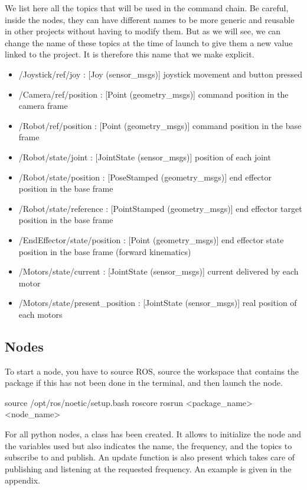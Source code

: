 We list here all the topics that will be used in the command chain. Be careful, inside the nodes, they can have different names to be more generic and reusable in other projects without having to modify them. But as we will see, we can change the name of these topics at the time of launch to give them a new value linked to the project. It is therefore this name that we make explicit. 
\begin{itemize}
    \item /Joystick/ref/joy : [Joy (sensor\_msgs)] joystick movement and button pressed
    \item /Camera/ref/position : [Point (geometry\_msgs)] command position in the camera frame
    \item /Robot/ref/position : [Point (geometry\_msgs)] command position in the base frame
    \item /Robot/state/joint : [JointState (sensor\_msgs)] position of each joint
    \item /Robot/state/position : [PoseStamped (geometry\_msgs)] end effector position in the base frame
    \item /Robot/state/reference : [PointStamped (geometry\_msgs)] end effector target position in the base frame
    \item /EndEffector/state/position : [Point (geometry\_msgs)] end effector state position in the base frame (forward kinematics)
    \item /Motors/state/current : [JointState (sensor\_msgs)] current delivered by each motor
    \item /Motors/state/present\_position : [JointState (sensor\_msgs)] real position of each motors
\end{itemize}

\subsection{Nodes}
To start a node, you have to source ROS, source the workspace that contains the package if this has not been done in the terminal, and then launch the node.
\begin{commandshell}
    source /opt/ros/noetic/setup.bash
    roscore
    rosrun <package_name> <node_name>
\end{commandshell}

\bigbreak
For all python nodes, a class has been created. It allows to initialize the node and the variables used but also indicates the name, the frequency, and the topics to subscribe to and publish. An update function is also present which takes care of publishing and listening at the requested frequency. An example is given in the appendix.

